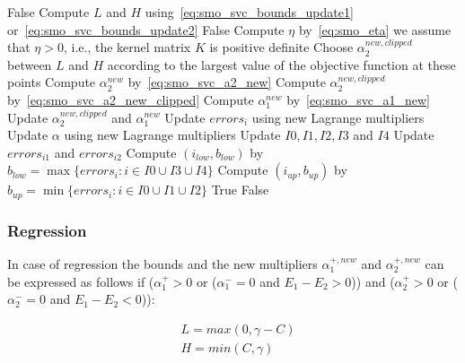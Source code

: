 \begin{breakablealgorithm}
	\newpage
	
	\begin{algorithmic}
				\State \Return False
			\EndIf
			\State Compute $L$ and $H$ using~\eqref{eq:smo_svc_bounds_update1} or~\eqref{eq:smo_svc_bounds_update2}
				\State \Return False
			\EndIf
			\State Compute $\eta$ by~\eqref{eq:smo_eta} \Comment we assume that $\eta > 0$, i.e., the kernel matrix $K$ is positive definite
				\State Choose $\alpha_2^{new,clipped}$ between $L$ and $H$ according to the largest value of the objective function at these points
			\Else
				\State Compute $\alpha_2^{new}$ by~\eqref{eq:smo_svc_a2_new}
				\State Compute $\alpha_2^{new,clipped}$ by~\eqref{eq:smo_svc_a2_new_clipped}
			\EndIf
				\State Compute $\alpha_1^{new}$ by~\eqref{eq:smo_svc_a1_new}
				\State Update $\alpha_2^{new,clipped}$ and $\alpha_1^{new}$
					\State Update $errors_i$ using new Lagrange multipliers
				\EndFor
				\State Update $\alpha$ using new Lagrange multipliers
				\State Update $I0, I1, I2, I3$ and $I4$
				\State Update $errors_{i1}$ and $errors_{i2}$
					\State Compute $(i_{low}, b_{low})$ by $b_{low} = \max\{errors_i : i \in I0 \cup I3 \cup I4\}$
					\State Compute $(i_{up}, b_{up})$ by $b_{up} = \min\{errors_i : i \in I0 \cup I1 \cup I2\}$
				\EndFor
				\State \Return True
			\Else
				\State \Return False
			\EndIf
		\EndFunction
	\end{algorithmic}
\end{breakablealgorithm}

\newpage

\subsubsection{Regression}

In case of regression the bounds and the new multipliers $\alpha_1^{+,new}$ and $\alpha_2^{+,new}$ can be expressed as follows if ($\alpha_1^+ > 0$ or ($\alpha_1^- = 0$ and $ E_1 - E_2 > 0$)) and ($\alpha_2^+ > 0$ or ($\alpha_2^- = 0$ and $ E_1 - E_2 < 0$)):

\begin{equation} \label{eq:smo_svr_bounds_update1}
	\begin{aligned}
		& L = max(0, \gamma - C) \\
		& H = min(C, \gamma)
	\end{aligned}
\end{equation}

